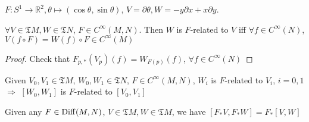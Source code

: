 \begin{example}
     $ F:S^1\rightarrow \mathbb{R}^2,\theta\mapsto (\cos \theta,\sin \theta) $,  $ V=\partial \theta,W=-y\partial x+x\partial y $. 
\end{example}
\begin{lemma}
     $ \forall V\in\mathfrak{T}M, W\in \mathfrak{T}N $,  $ F\in C^\infty (M,N) $. Then  $ W $ is  $ F $-related to  $ V $ iff  $ \forall  f\in C^\infty (N) $,  $ V(f\circ F)=W(f)\circ F\in C^\infty (M) $     
\end{lemma}
\begin{proof}
    Check that  $ F_{p,*}(V_p)(f)=W_{F(p)}(f) $,  $ \forall f\in C^\infty(N) $
\end{proof}
\begin{proposition}
    Given  $ V_0,V_1\in \mathfrak{T}M $,  $ W_0,W_1\in \mathfrak{T}N $,  $ F\in C^\infty(M,N) $,  $ W_i $ is  $ F $-related to  $ V_i $, $ i=0,1 $  $ \Rightarrow  $ $ [W_0,W_1] $  is  $ F $-related to  $ [V_0,V_1] $         
\end{proposition}
\begin{corollary}
    Given any  $ F\in \mathrm{Diff}(M,N) $,  $ V\in \mathfrak{T}M, W\in \mathfrak{T}M  $, we have  $ [F_*V,F_*W]=F_*[V,W] $   
\end{corollary}
